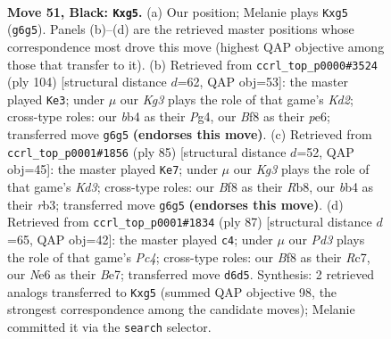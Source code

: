 \documentclass[11pt]{article}
\begin{document}
\clearpage

\begin{figure}[p]\centering
\begin{subfigure}{0.46\textwidth}\centering
\resizebox{\linewidth}{!}{%
\newchessgame
\chessboard[
  setfen={3r1b2/7p/p2pn1k1/P3p1Pp/1BP1P3/1P3P1R/3K2B1/8 b - - 4 51},
  showmover=false,
  pgfstyle=straightmove, color=movearrow, markmove={g6-g5}
]}
\caption{}
\end{subfigure}\hfill
\begin{subfigure}{0.46\textwidth}\centering
\resizebox{\linewidth}{!}{%
\newchessgame
\chessboard[
  setfen={4k3/2b5/1p2p1b1/pPp1Ppp1/P1N3P1/7P/2BK4/8 w - - 10 53},
  showmover=false,
  pgfstyle=straightmove, color=movearrow, markmove={d2-e3}
]}
\caption{}
\end{subfigure}
\\[4pt]
\begin{subfigure}{0.46\textwidth}\centering
\resizebox{\linewidth}{!}{%
\newchessgame
\chessboard[
  setfen={1r6/8/1pnkp3/p2p2Pp/P2P4/1RB2PK1/1P6/1b1B4 b - - 0 43},
  showmover=false,
  pgfstyle=straightmove, color=movearrow, markmove={d6-e7}
]}
\caption{}
\end{subfigure}\hfill
\begin{subfigure}{0.46\textwidth}\centering
\resizebox{\linewidth}{!}{%
\newchessgame
\chessboard[
  setfen={8/2r1bpk1/6p1/1ppBP2p/7P/1P4P1/2R2PK1/8 b - - 0 44},
  showmover=false,
  pgfstyle=straightmove, color=movearrow, markmove={c5-c4}
]}
\caption{}
\end{subfigure}
\caption{\textbf{Move 51, Black: \texttt{Kxg5}.} (a) Our position; Melanie plays \texttt{Kxg5} (\texttt{g6g5}). Panels (b)--(d) are the retrieved master positions whose correspondence most drove this move (highest QAP objective among those that transfer to it). (b) Retrieved from \texttt{ccrl\_top\_p0000\#3524} (ply 104) [structural distance $d$=62, QAP obj=53]: the master played \texttt{Ke3}; under $\mu$ our \emph{Kg3} plays the role of that game's \emph{Kd2}; cross-type roles: our \emph{b}b4 as their \emph{P}g4, our \emph{B}f8 as their \emph{p}e6; transferred move \texttt{g6g5} \textbf{(endorses this move)}. (c) Retrieved from \texttt{ccrl\_top\_p0001\#1856} (ply 85) [structural distance $d$=52, QAP obj=45]: the master played \texttt{Ke7}; under $\mu$ our \emph{Kg3} plays the role of that game's \emph{Kd3}; cross-type roles: our \emph{B}f8 as their \emph{R}b8, our \emph{b}b4 as their \emph{r}b3; transferred move \texttt{g6g5} \textbf{(endorses this move)}. (d) Retrieved from \texttt{ccrl\_top\_p0001\#1834} (ply 87) [structural distance $d$=65, QAP obj=42]: the master played \texttt{c4}; under $\mu$ our \emph{Pd3} plays the role of that game's \emph{Pc4}; cross-type roles: our \emph{B}f8 as their \emph{R}c7, our \emph{N}e6 as their \emph{B}e7; transferred move \texttt{d6d5}. Synthesis: 2 retrieved analogs transferred to \texttt{Kxg5} (summed QAP objective 98, the strongest correspondence among the candidate moves); Melanie committed it via the \texttt{search} selector.}
\label{fig:thought-m101}
\end{figure}
\end{document}
